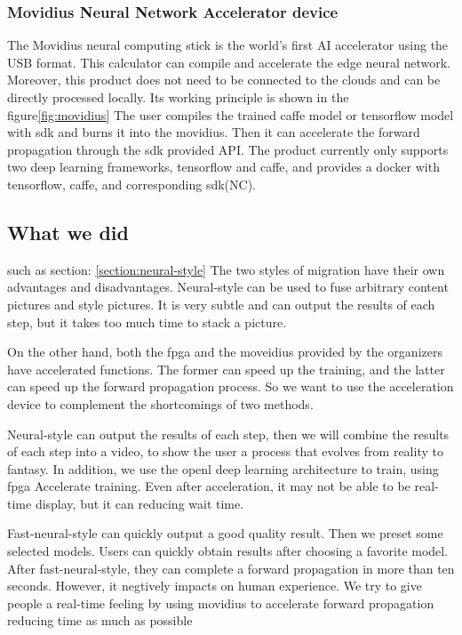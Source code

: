 \subsubsection{Movidius Neural Network Accelerator device}
The Movidius neural computing stick is the world's first AI accelerator using the USB format. This calculator can compile and accelerate the edge neural network. Moreover, this product does not need to be connected to the clouds and can be directly processed locally. Its working principle is shown in the figure\ref{fig:movidius}
The user compiles the trained caffe model or tensorflow model with sdk and burns it into the movidius. Then it can accelerate the forward propagation through the sdk provided API.
The product currently only supports two deep learning frameworks, tensorflow and caffe, and provides a docker with tensorflow, caffe, and corresponding sdk(NC).
\subsection{What we did}
such as section: \ref{section:neural-style} The two styles of migration have their own advantages and disadvantages. Neural-style can be used to fuse arbitrary content pictures and style pictures. It is very subtle and can output the results of each step, but it takes too much time to stack a picture. 

On the other hand, both the fpga and the moveidius provided by the organizers have accelerated functions. The former can speed up the training, and the latter can speed up the forward propagation process. So we want to use the acceleration device to complement the shortcomings of two methods.

Neural-style can output the results of each step, then we will combine the results of each step into a video, to show the user a process that evolves from reality to fantasy. In addition, we use the openl deep learning architecture to train, using fpga Accelerate training. Even after acceleration, it may not be able to be real-time display, but it can reducing wait time.

Fast-neural-style can quickly output a good quality result. Then we preset some selected models.
Users can quickly obtain results after choosing a favorite model. After fast-neural-style, they can complete a forward propagation in more than ten seconds.
However, it negtively impacts on human experience. We try to give people a real-time feeling by using movidius to accelerate forward propagation reducing time as much as possible

